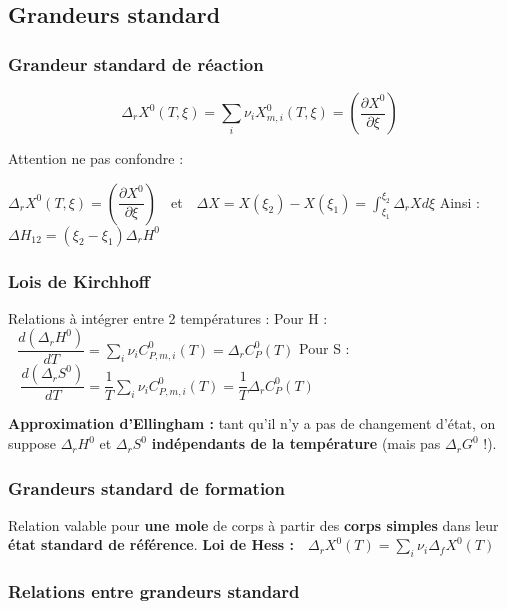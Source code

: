 \documentclass[9pt,twocolumn]{article}
\begin{document}
\setlength{\columnseprule}{0.1pt}
\begin{center}
\part*{Grandeurs standard}
\end{center}
\section{Grandeur standard de réaction}

$$\boxed{ \Delta _r X^0(T,\xi) = \sum\limits_i \nu_i X^0_{m,i}(T,\xi) = \left(\dfrac{\partial X^0}{\partial \xi} \right) }$$

Attention ne pas confondre : 

$\Delta _r X^0(T,\xi) =\left(\dfrac{\partial X^0}{\partial \xi} \right) \>\>\>$ et $\>\>\> \Delta X = X(\xi_2)-X(\xi_1) = \displaystyle{\int_{\xi_1}^{\xi_2} \Delta_r X d\xi}$
\medbreak
Ainsi : $\boxed{\Delta H_{12}=(\xi_2-\xi_1) \Delta_r H^0}$

\section{Lois de Kirchhoff}
Relations à intégrer entre 2 températures :
\smallbreak
Pour H : $\>\>\>\boxed{\dfrac{d(\Delta_r H^0)}{dT}=\sum\limits_i\nu_i C_{P,m,i}^0(T) = \Delta_rC_P^0(T)}$ 
\smallbreak
Pour S : $\>\>\>\>\boxed{\dfrac{d(\Delta_r S^0)}{dT}=\dfrac{1}{T}\sum\limits_i\nu_i C_{P,m,i}^0(T) = \dfrac{1}{T}\Delta_rC_P^0(T)}$

\smallbreak

\textbf{Approximation d'Ellingham :} tant qu'il n'y a pas de changement d'état, on suppose $\Delta_rH^0$ et $\Delta_rS^0$ \textbf{indépendants de la température} (mais pas $\Delta_rG^0$ !).

\section{Grandeurs standard de formation}
Relation valable pour \textbf{une mole} de corps à partir des \textbf{corps simples} dans leur \textbf{état standard de référence}.
\medbreak
\textbf{Loi de Hess :} $\>\>\>\boxed{\Delta_rX^0(T)=\sum\limits_i\nu_i\Delta_fX^0(T)}$

\section{Relations entre grandeurs standard}
\end{document}
